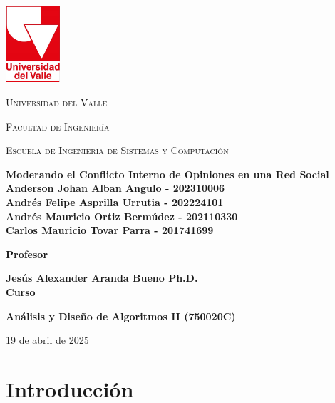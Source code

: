 \documentclass[11pt,letter]{article}
\begin{document}
\onehalfspacing

\begin{titlepage}
\centering
\includegraphics[width=0.15\textwidth]{resources/universidad-del-valle.png}\par\vspace{1cm}
{\scshape\LARGE Universidad del Valle \par}
{\scshape\Large Facultad de Ingeniería \par}
{\scshape\Large Escuela de Ingeniería de Sistemas y Computación \par}
\vspace{2cm}

{\Large \textbf{Moderando el Conflicto Interno de Opiniones en una Red Social}}\\

\vspace{2cm}
    {\large \textbf{Anderson Johan Alban Angulo - 202310006}}\\
    {\large \textbf{Andrés Felipe Asprilla Urrutia - 202224101 }}\\
    {\large \textbf{Andrés Mauricio Ortiz Bermúdez - 202110330}}\\
    {\large \textbf{Carlos Mauricio Tovar Parra - 201741699}}\\
\vspace{2cm}

    \Large\textbf{Profesor}\par
    {\large \textbf{Jesús Alexander Aranda Bueno Ph.D.}}\\
\vspace{1.4cm}
    \Large\textbf{Curso}\par
    {\large \textbf{Análisis y Diseño de Algoritmos II (750020C)}}\\
\vspace{1cm}
{\large {19 de abril de 2025}\par}
\end{titlepage}

\tableofcontents
\newpage

\section{Introducción}
\end{document}
